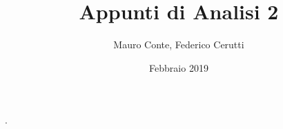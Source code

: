 \documentclass[a4paper,14pt,oneside]{book}
\begin{document}
		
\newtheorem{definition}{Definizione}
\newtheorem{proposition}{Proposizione}
\newtheorem{theorem}{Teorema}
\newtheorem{observation}{Osservazione}
\newtheorem{corollary}{Corollario}
\newtheorem{example}{Esempio}
\newtheorem{exercise}{Esercizio}
\newtheorem*{note}{Nota}

  {} %
  {} %
  {\itshape\small\addtolength{\leftskip}{1em}} %
  { } %
  {\bfseries} %
  {.} %
  { } %
  { } %
\theoremstyle{exercise_answer}
\newtheorem*{exercise_answer}{Soluzione}

\newcommand{\norm}[1] {\left\|#1\right\|}
\newcommand{\abs}[1] {\left|#1\right|}

\newcommand{\bbset}[1] {\mathbb{#1}}
\newcommand{\bbsetn}[2] {\mathbb{#1}^{#2}}

\newcommand{\realintervalopen}[2] {\left]#1,#2\right[}
\newcommand{\realintervalclose}[2] {\left[#1,#2\right]}
\newcommand{\realintervalclor}[2] {\left[#1,#2\right]}
\newcommand{\realintervalolcr}[2] {\left[#1,#2\right]}
\newcommand{\realfunction}[3]{ #1:#2\to#3}
\newcommand{\trigonpol}[3] {\frac{a_0}{2}+\sum\limits_{#1=#2}^{#3}a_{#1}cos(#1x)+b_{#1}sin(#1x)}

\newcommand{\dinfty}[2]{d_\infty\left(#1,#2\right)}
\newcommand{\ddinfty}[3]{\sup\limits_{x\in#3}{\left|f-g\right|}}
\newcommand{\sse}{\Leftrightarrow}

\newcommand{\R}{\mathbb{R}}

\newcommand{\rvect}[1]{\begin{bmatrix} #1 \end{bmatrix}}

\newcommand{\circdot}[1]{\accentset{\circ}{#1}}


\author{Mauro Conte, Federico Cerutti}
\title{Appunti di Analisi 2}
\date{Febbraio 2019}

\frontmatter
\maketitle
\tableofcontents

\mainmatter








\backmatter
\end{document}
